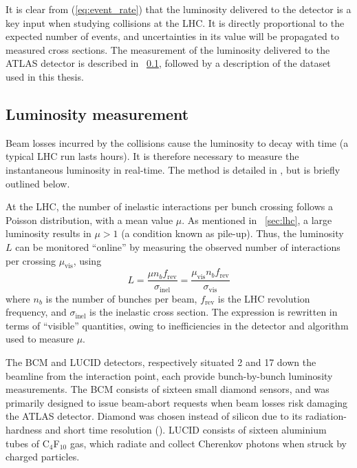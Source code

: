 
It is clear from (\ref{eq:event_rate}) that the luminosity delivered to the detector is a 
key input when studying \pp collisions at the \ac{LHC}. It is directly proportional to the 
expected number of events, and uncertainties in its value will be propagated to measured 
cross sections. The measurement of the luminosity delivered to the ATLAS detector is 
described in \Section~\ref{sec:dataset:lumi}, followed by a description of the dataset 
used in this thesis.



\subsection{Luminosity measurement}
\label{sec:dataset:lumi}

Beam losses incurred by the \pp collisions cause the luminosity to decay with time (a
typical \ac{LHC} run lasts  hours). It is therefore necessary to measure 
the instantaneous luminosity in real-time. The method is detailed in \cite{Lumi2011}, but 
is briefly outlined below.

At the \ac{LHC}, the number of inelastic \pp interactions per bunch crossing follows a 
Poisson distribution, with a mean value $\mu$. As mentioned in \Section~\ref{sec:lhc}, 
a large luminosity results in $\mu > 1$ (a condition known as pile-up). Thus, the 
luminosity $L$ can be monitored ``online'' by measuring the observed number of interactions
per crossing $\mu_{\text{vis}}$, using
\begin{equation}
	L = \frac{\mu n_b f_{\text{rev}}}{\sigma_{\text{inel}}}
	= \frac{\mu_{\text{vis}} n_b f_{\text{rev}}}{\sigma_{\text{vis}}}
	\label{eq:lumi_measure}
\end{equation}
where $n_b$ is the number of bunches per beam, $f_{\text{rev}}$ is the \ac{LHC} revolution 
frequency, and $\sigma_{\text{inel}}$ is the inelastic \pp cross section. The 
expression is rewritten in terms of ``visible'' quantities, owing to inefficiencies in the
detector and algorithm used to measure $\mu$.

The \ac{BCM} and LUCID detectors, respectively situated \unit{2}{\metre} and 
\unit{17}{\metre} down the beamline from the interaction point, each provide 
bunch-by-bunch luminosity measurements. The \ac{BCM} consists of sixteen small diamond 
sensors, and was primarily designed to issue beam-abort requests when beam losses risk 
damaging the ATLAS detector. Diamond was chosen instead of silicon due to its 
radiation-hardness and short time resolution (\unit{}{\nano\second}).
LUCID consists of sixteen aluminium tubes of C$_4$F$_{10}$ gas, which radiate and collect 
Cherenkov photons when struck by charged particles.

